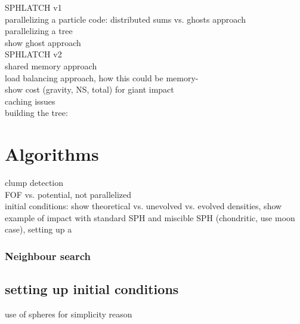 SPHLATCH v1\\
parallelizing a particle code: distributed sums vs. ghosts approach\\
parallelizing a tree\\
show ghost approach\\

SPHLATCH v2\\
shared memory approach\\
load balancing approach, how this could be memory-\\
show cost (gravity, NS, total) for giant impact\\
caching issues\\

building the tree:

\section{Algorithms}
clump detection\\
FOF vs. potential, not parallelized\\
initial conditions: show theoretical vs. unevolved vs. evolved densities, show example of impact with standard SPH and miscible SPH (chondritic, use moon case), setting up a \SSC \\


\subsubsection{Neighbour search}

\subsection{setting up initial conditions}
use of spheres for simplicity reason

\citep{Barnes:1986p2853}
\citep{Monaghan:2005p2677}
\citep{Price:2004p2613}





